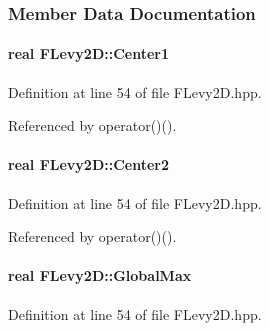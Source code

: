 \subsubsection{\-Member \-Data \-Documentation}
\hypertarget{classFLevy2D_a2ac016c1aefc1f4885817e5c96a35b5d}{
\paragraph[{\-Center1}]{\setlength{\rightskip}{0pt plus 5cm}real {\bf \-F\-Levy2\-D\-::\-Center1}}}\label{classFLevy2D_a2ac016c1aefc1f4885817e5c96a35b5d}


\-Definition at line 54 of file \-F\-Levy2\-D.\-hpp.



\-Referenced by operator()().

\hypertarget{classFLevy2D_a40852278de546d74fa99913e5f107b51}{
\paragraph[{\-Center2}]{\setlength{\rightskip}{0pt plus 5cm}real {\bf \-F\-Levy2\-D\-::\-Center2}}}\label{classFLevy2D_a40852278de546d74fa99913e5f107b51}


\-Definition at line 54 of file \-F\-Levy2\-D.\-hpp.



\-Referenced by operator()().

\hypertarget{classFLevy2D_ab9b008eeb65b79ca24dfd782a8d1541e}{
\paragraph[{\-Global\-Max}]{\setlength{\rightskip}{0pt plus 5cm}real {\bf \-F\-Levy2\-D\-::\-Global\-Max}}}\label{classFLevy2D_ab9b008eeb65b79ca24dfd782a8d1541e}


\-Definition at line 54 of file \-F\-Levy2\-D.\-hpp.



